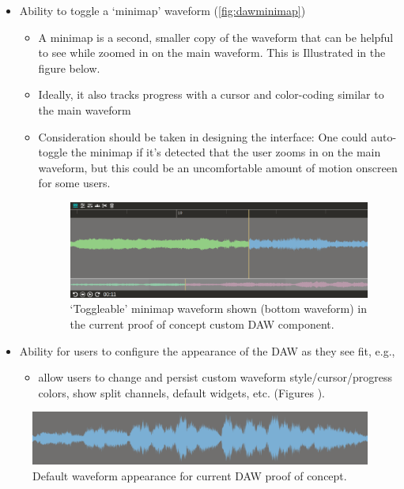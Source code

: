 \documentclass[manuscript,screen,review]{acmart}
\begin{document}
\begin{itemize}
    \item Ability to toggle a `minimap' waveform (\autoref{fig:dawminimap})
        \begin{itemize}
            \item A minimap is a second, smaller copy of the waveform that can be helpful to see while zoomed in on the main waveform. This is Illustrated in the figure below.
            \item Ideally, it also tracks progress with a cursor and color-coding similar to the main waveform
            \item Consideration should be taken in designing the interface: One could auto-toggle the minimap if it's detected that the user zooms in on the main waveform, but this could be an uncomfortable amount of motion onscreen for some users.
        \begin{figure}[H]
        \centering
            \includegraphics[width=1\linewidth]{proposal//images/minimap-zoom-2.png}
            \caption{`Toggleable' minimap waveform shown (bottom waveform) in the current proof of concept custom DAW component.}
            \label{fig:dawminimap}
        \end{figure}
        \end{itemize}
    
    \item Ability for users to configure the appearance of the DAW as they see fit, e.g., 
        \begin{itemize}
            \item allow users to change and persist custom waveform style/cursor/progress colors, show split channels, default widgets, etc. (Figures ).
        \end{itemize}
\end{itemize}

\begin{figure}[H]
    \centering
    \includegraphics[width=\linewidth]{proposal//images/daw-std-4.png}
    \caption{Default waveform appearance for current DAW proof of concept.}
    \label{fig:default}
\end{figure}
\end{document}
